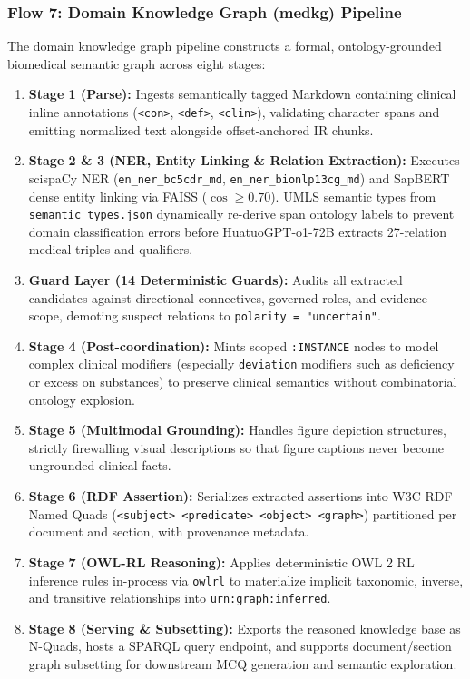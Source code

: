 \subsubsection*{Flow 7: Domain Knowledge Graph (medkg) Pipeline}

The domain knowledge graph pipeline constructs a formal, ontology-grounded biomedical semantic graph across eight stages:

\begin{sloppypar}
\begin{enumerate}
    \item \textbf{Stage 1 (Parse):} Ingests semantically tagged Markdown containing clinical inline annotations (\texttt{<con>}, \texttt{<def>}, \texttt{<clin>}), validating character spans and emitting normalized text alongside offset-anchored IR chunks.
    \item \textbf{Stage 2 \& 3 (NER, Entity Linking \& Relation Extraction):} Executes scispaCy NER (\texttt{en\_ner\_bc5cdr\_md}, \texttt{en\_ner\_bionlp13cg\_md}) and SapBERT dense entity linking via FAISS ($\cos \ge 0.70$). UMLS semantic types from \texttt{semantic\_types.json} dynamically re-derive span ontology labels to prevent domain classification errors before HuatuoGPT-o1-72B extracts 27-relation medical triples and qualifiers.
    \item \textbf{Guard Layer (14 Deterministic Guards):} Audits all extracted candidates against directional connectives, governed roles, and evidence scope, demoting suspect relations to \texttt{polarity = "uncertain"}.
    \item \textbf{Stage 4 (Post-coordination):} Mints scoped \texttt{:INSTANCE} nodes to model complex clinical modifiers (especially \texttt{deviation} modifiers such as deficiency or excess on substances) to preserve clinical semantics without combinatorial ontology explosion.
    \item \textbf{Stage 5 (Multimodal Grounding):} Handles figure depiction structures, strictly firewalling visual descriptions so that figure captions never become ungrounded clinical facts.
    \item \textbf{Stage 6 (RDF Assertion):} Serializes extracted assertions into W3C RDF Named Quads (\texttt{<subject> <predicate> <object> <graph>}) partitioned per document and section, with provenance metadata.
    \item \textbf{Stage 7 (OWL-RL Reasoning):} Applies deterministic OWL 2 RL inference rules in-process via \texttt{owlrl} to materialize implicit taxonomic, inverse, and transitive relationships into \texttt{urn:graph:inferred}.
    \item \textbf{Stage 8 (Serving \& Subsetting):} Exports the reasoned knowledge base as N-Quads, hosts a SPARQL query endpoint, and supports document/section graph subsetting for downstream MCQ generation and semantic exploration.
\end{enumerate}
\end{sloppypar}

